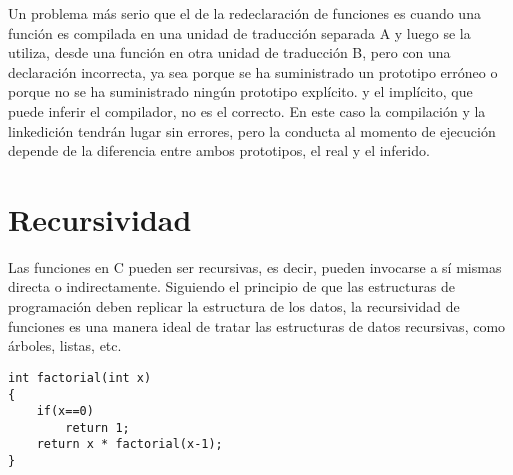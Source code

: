 Un problema más serio que el de la redeclaración de funciones es cuando una
función es compilada en una unidad de traducción separada A y luego se la
utiliza, desde una función en otra unidad de traducción B, pero con una
declaración incorrecta, ya sea porque se ha suministrado un prototipo erróneo o
porque no se ha suministrado ningún prototipo explícito. y el implícito, que
puede inferir el compilador, no es el correcto. En este caso la compilación y
la linkedición tendrán lugar sin errores, pero la conducta al momento de
ejecución depende de la diferencia entre ambos prototipos, el real y el
inferido.

\section{Recursividad}
Las funciones en C pueden ser recursivas, es decir, pueden invocarse a sí
mismas directa o indirectamente. Siguiendo el principio de que las estructuras
de programación deben replicar la estructura de los datos, la recursividad de
funciones es una manera ideal de tratar las estructuras de datos recursivas,
como árboles, listas, etc.
\begin{lstlisting}
int factorial(int x)
{
    if(x==0)
        return 1;
    return x * factorial(x-1);
}
\end{lstlisting}



